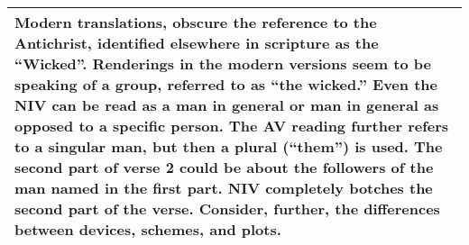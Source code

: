 \begin{mdframed}[style=MyFrame]
\begin{center}
\begin{longtable}{|p{.5in}|p{3.5in}|}
 \multicolumn{2}{p{4.3in}}{{Modern translations, obscure the reference to the Antichrist, identified elsewhere in scripture as the ``Wicked''.  Renderings in the modern versions seem to be speaking of a group, referred to as ``the wicked.'' Even the NIV can be read as a man in general or man in general as opposed to a specific person. The AV reading further refers to a singular man, but then a plural (``them'') is used. The second part of verse 2 could be about the followers of the man named in the first part. NIV completely botches the second part of the verse. Consider, further, the differences between devices, schemes, and plots.}} \\ %

\hline

\end{longtable}
\end{center}

\normalsize 
\end{mdframed}

\newpage

